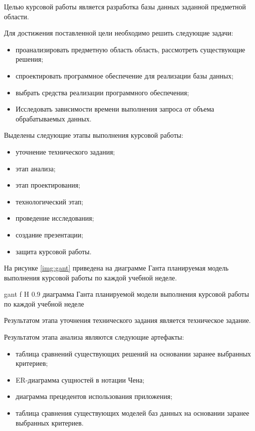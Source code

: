 \documentclass{bmstu}
\begin{document}
	Целью курсовой работы является разработка базы данных заданной предметной области.
	
	Для достижения поставленной цели необходимо решить следующие задачи:
	\begin{itemize}
		\item проанализировать предметную область область, рассмотреть существующие решения;
		\item спроектировать программное обеспечение для реализации базы данных;
		\item выбрать средства реализации программного обеспечения;
		\item Исследовать зависимости времени выполнения запроса от объема обрабатываемых данных.
	\end{itemize}
	
	Выделены следующие этапы выполнения курсовой работы:
	\begin{itemize}
		\item уточнение технического задания;
		\item этап анализа;
		\item этап проектирования;
		\item технологический этап;
		\item проведение исследования;
		\item создание презентации;
		\item защита курсовой работы.
	\end{itemize}
	
	На рисунке \ref{img:gant} приведена на диаграмме Ганта планируемая модель выполнения курсовой работы по каждой учебной неделе.
	
	{gant} 
	{f} 
	{H} 
	{0.9\textwidth} 
	{диаграмма Ганта планируемой модели выполнения курсовой работы по каждой учебной неделе}
	
	Результатом этапа уточнения технического задания является техническое задание.
	
	Результатом этапа анализа являются следующие артефакты:
	\begin{itemize}
		\item таблица сравнений существующих решений на основании заранее выбранных критериев;
		\item ER-диаграмма сущностей в нотации Чена;
		\item диаграмма прецедентов использования приложения;
		\item таблица сравнения существующих моделей баз данных на основании заранее выбранных критериев.
	\end{itemize}
	
\end{document}
